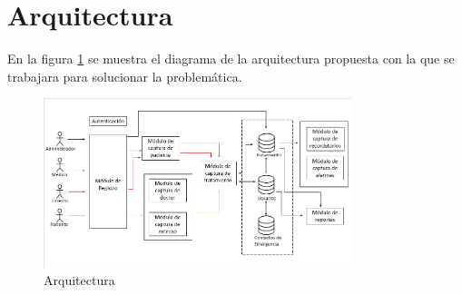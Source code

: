 \section{Arquitectura}

En la figura \ref{fig:arquitectura} se muestra el diagrama de la arquitectura propuesta con la que se trabajara para solucionar la problemática.


\begin{figure}[htb]
	\centering
	\includegraphics[width=0.8\textwidth]{images/cap2/Arquitectura}
	\caption{Arquitectura} \label{fig:arquitectura}
\end{figure}

